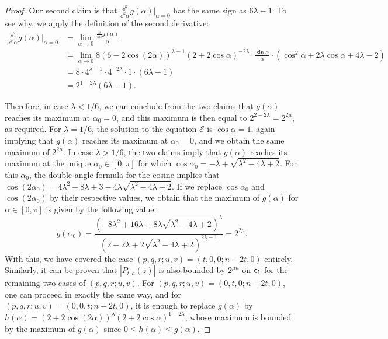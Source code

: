 \documentclass[11pt]{llncs}
\begin{document}
\begin{proof}
    Our second claim is that $\frac{\dd^2}{\dd^2\alpha}g(\alpha)\vert_{\alpha=0}$ has the same sign as $6\lambda -1$. To see why, we apply the definition of the second derivative:
    \begin{align*}
        \frac{\dd^2}{\dd^2\alpha}g(\alpha)\vert_{\alpha=0}
        &=\lim_{\alpha\to 0}\frac{\frac{\dd}{\dd\alpha}g(\alpha)}{\alpha}\\
        &=\lim_{\alpha\to 0}8(6-2\cos(2\alpha))^{\lambda-1}(2+2\cos\alpha)^{-2\lambda}\cdot\frac{\sin\alpha}{\alpha}\cdot\left(\cos^2\alpha+2\lambda\cos\alpha+4\lambda-2\right)\\
        &=8\cdot4^{\lambda-1}\cdot 4^{-2\lambda}\cdot 1\cdot(6\lambda -1)\\
        &=2^{1-2\lambda}(6\lambda -1).
    \end{align*}
    
    Therefore, in case $\lambda<1/6$, we can conclude from the two claims that $g(\alpha)$ reaches its maximum at $\alpha_0=0$, and this maximum is then equal to $2^{2-2\lambda}=2^{2\mu}$, as required. For $\lambda=1/6$, the solution to the equation $\mathcal E$ is $\cos\alpha=1$, again implying that $g(\alpha)$ reaches its maximum at $\alpha_0=0$, and we obtain the same maximum of $2^{2\mu}$. In case $\lambda>1/6$, the two claims imply that $g(\alpha)$ reaches its maximum at the unique $\alpha_0\in[0,\pi]$ for which $\cos\alpha_0=-\lambda+\sqrt{\lambda^2-4\lambda+2}$. For this $\alpha_0$, the double angle formula for the cosine implies that $\cos(2\alpha_0)=4\lambda^2-8\lambda+3-4\lambda\sqrt{\lambda^2-4\lambda+2}$. If we replace $\cos\alpha_0$ and $\cos(2\alpha_0)$ by their respective values, we obtain that the maximum of $g(\alpha)$ for $\alpha\in[0,\pi]$ is given by the following value:
    \[
        g(\alpha_0)=\frac{\left(-8\lambda^2+16\lambda+8\lambda\sqrt{\lambda^2-4\lambda+2}\right)^{\lambda}}{\left(2-2\lambda+2\sqrt{\lambda^2-4\lambda+2}\right)^{2\lambda-1}}=2^{2\mu}.
    \]
    With this, we have covered the case $(p,q,r;u,v)=(t,0,0;n-2t,0)$ entirely. Similarly, it can be proven that $|P_{t,a}(z)|$ is also bounded by $2^{\mu n}$ on $\mathsf{c_1}$ for the remaining two cases of $(p,q,r;u,v)$. 
    For $(p,q,r;u,v)=(0,t,0;n-2t,0)$, one can proceed in exactly the same way, and for $(p,q,r;u,v)=(0,0,t;n-2t,0)$, it is enough to replace $g(\alpha)$ by $h(\alpha)=(2+2\cos(2\alpha))^\lambda(2+2\cos\alpha)^{1-2\lambda}$, whose maximum is bounded by the maximum of $g(\alpha)$ since $0\leq h(\alpha)\leq g(\alpha)$.
\end{proof}
\end{document}
